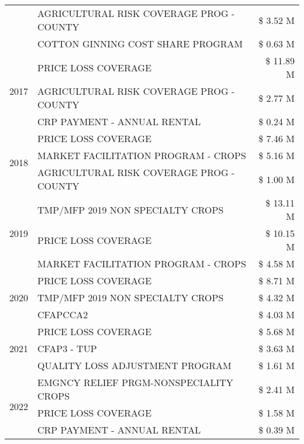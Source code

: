 \begin{tabular}{llr}
 & AGRICULTURAL RISK COVERAGE PROG - COUNTY & \$ 3.52 M \\
 & COTTON GINNING COST SHARE PROGRAM & \$ 0.63 M \\
\cline{1-3}
\multirow[t]{3}{*}{2017} & PRICE LOSS COVERAGE & \$ 11.89 M \\
 & AGRICULTURAL RISK COVERAGE PROG - COUNTY & \$ 2.77 M \\
 & CRP PAYMENT - ANNUAL RENTAL & \$ 0.24 M \\
\cline{1-3}
\multirow[t]{3}{*}{2018} & PRICE LOSS COVERAGE & \$ 7.46 M \\
 & MARKET FACILITATION PROGRAM - CROPS & \$ 5.16 M \\
 & AGRICULTURAL RISK COVERAGE PROG - COUNTY & \$ 1.00 M \\
\cline{1-3}
\multirow[t]{3}{*}{2019} & TMP/MFP 2019 NON SPECIALTY CROPS & \$ 13.11 M \\
 & PRICE LOSS COVERAGE & \$ 10.15 M \\
 & MARKET FACILITATION PROGRAM - CROPS & \$ 4.58 M \\
\cline{1-3}
\multirow[t]{3}{*}{2020} & PRICE LOSS COVERAGE & \$ 8.71 M \\
 & TMP/MFP 2019 NON SPECIALTY CROPS & \$ 4.32 M \\
 & CFAPCCA2 & \$ 4.03 M \\
\cline{1-3}
\multirow[t]{3}{*}{2021} & PRICE LOSS COVERAGE & \$ 5.68 M \\
 & CFAP3 - TUP & \$ 3.63 M \\
 & QUALITY LOSS ADJUSTMENT PROGRAM & \$ 1.61 M \\
\cline{1-3}
\multirow[t]{3}{*}{2022} & EMGNCY RELIEF PRGM-NONSPECIALITY CROPS & \$ 2.41 M \\
 & PRICE LOSS COVERAGE & \$ 1.58 M \\
 & CRP PAYMENT - ANNUAL RENTAL & \$ 0.39 M \\
\cline{1-3}
\bottomrule
\end{tabular}
